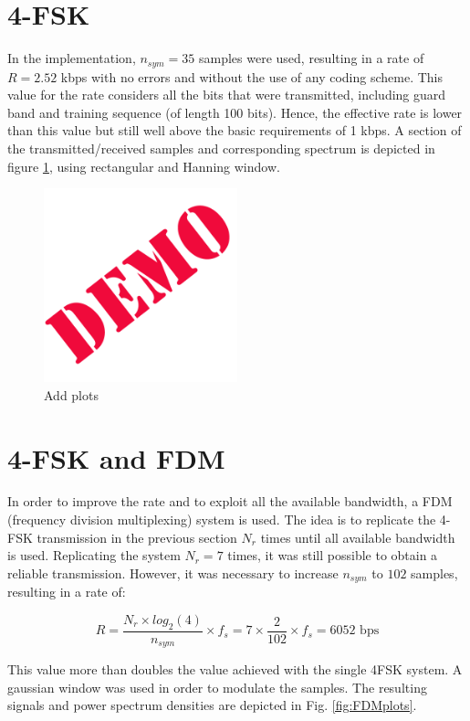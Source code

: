 \documentclass[12pt,a4paper,openright]{report}
\begin{document}
\section{4-FSK}

 In the implementation, $n_{sym}= 35$ samples were used, resulting in a rate of $R=2.52$ kbps with no errors and without the use of any coding scheme. This value for the rate considers all the bits that were transmitted, including guard band and training sequence (of length 100 bits). Hence, the effective rate is lower than this value but still well above the basic requirements of 1 kbps. A section of the  transmitted/received samples and corresponding spectrum is depicted in figure \ref{fig:4FSKplots}, using rectangular and Hanning window.
 
\begin{figure}[H]
  \centering
    \includegraphics[width=0.5\textwidth]{demo.png}
    \caption[Add caption]{Add plots}
    \label{fig:4FSKplots}
\end{figure}
 
 
\section{4-FSK and FDM}
In order to improve the rate and to exploit all the available bandwidth, a FDM (frequency division multiplexing) system is used. The idea is to replicate the 4-FSK transmission in the previous section $N_r$ times until all available bandwidth is used. Replicating the system $N_r=7$ times, it was still possible to obtain a reliable transmission. However, it was necessary to increase $n_{sym}$ to $102$ samples, resulting in a rate of:

$$ R = \frac{N_r\times log_2(4)}{n_{sym}}\times f_s = 7 \times \frac{2}{102}\times f_s = 6052 \text{ bps}$$

This value more than doubles the value achieved with the single 4FSK system. A gaussian window was used in order to modulate the samples. The resulting signals and power spectrum densities  are depicted in Fig. \ref{fig:FDMplots}.
\end{document}
